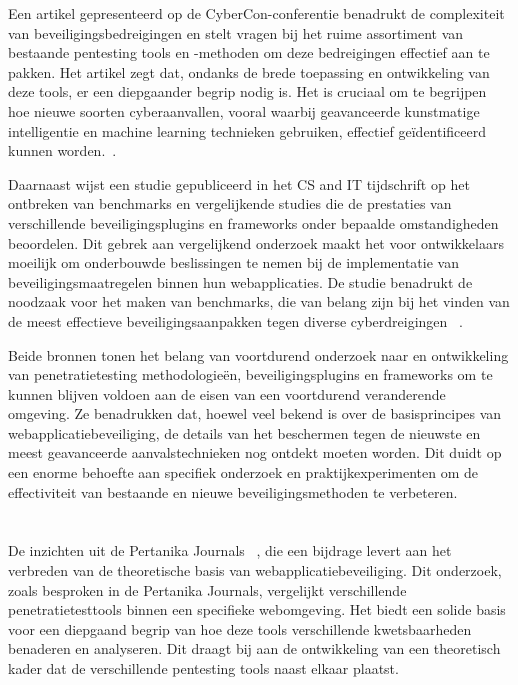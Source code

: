 Een artikel gepresenteerd op de CyberCon-conferentie benadrukt de complexiteit van beveiligingsbedreigingen en stelt vragen bij het ruime assortiment 
van bestaande pentesting tools en -methoden om deze bedreigingen effectief aan te pakken. Het artikel zegt dat, ondanks de brede toepassing en 
ontwikkeling van deze tools, er een diepgaander begrip nodig is. Het is cruciaal om te begrijpen hoe nieuwe soorten cyberaanvallen, vooral waarbij 
geavanceerde kunstmatige intelligentie en machine learning technieken gebruiken, effectief geïdentificeerd kunnen worden.~\autocite{Petrica2022}.

Daarnaast wijst een studie gepubliceerd in het CS and IT tijdschrift op het ontbreken van benchmarks en vergelijkende studies die de prestaties van verschillende 
beveiligingsplugins en frameworks onder bepaalde omstandigheden beoordelen. Dit gebrek aan vergelijkend onderzoek maakt het voor ontwikkelaars 
moeilijk om onderbouwde beslissingen te nemen bij de implementatie van beveiligingsmaatregelen binnen hun webapplicaties. De studie benadrukt de noodzaak voor 
het maken van benchmarks, die van belang zijn bij het vinden van de meest effectieve beveiligingsaanpakken tegen 
diverse cyberdreigingen ~\autocite{AbuDabaseh2018}.

Beide bronnen tonen het belang van voortdurend onderzoek naar en ontwikkeling van penetratietesting methodologieën, beveiligingsplugins en frameworks om te kunnen 
blijven voldoen aan de eisen van een voortdurend veranderende omgeving. Ze benadrukken dat, hoewel veel bekend is over de basisprincipes van webapplicatiebeveiliging, 
de details van het beschermen tegen de nieuwste en meest geavanceerde aanvalstechnieken nog ontdekt moeten worden. Dit duidt op een enorme behoefte aan 
specifiek onderzoek en praktijkexperimenten om de effectiviteit van bestaande en nieuwe beveiligingsmethoden te verbeteren.

\section{}
\subsection{}
De inzichten uit de Pertanika Journals ~\autocite{Jarupunphol2023}, die een bijdrage levert aan het verbreden van de theoretische basis van webapplicatiebeveiliging.
Dit onderzoek, zoals besproken in de Pertanika Journals, vergelijkt verschillende penetratietesttools binnen een specifieke webomgeving. Het biedt 
een solide basis voor een diepgaand begrip van hoe deze tools verschillende kwetsbaarheden benaderen en analyseren. Dit draagt bij aan de ontwikkeling 
van een theoretisch kader dat de verschillende pentesting tools naast elkaar plaatst.

